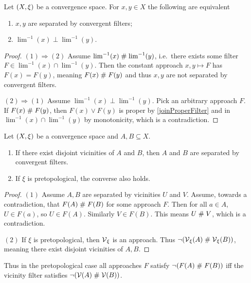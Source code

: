 \begin{lemma} \label{pointsSeparatedConvergentFilters}
Let $\left( X,\xi \right)$ be a convergence space. For $x,y\in X$ the following are equivalent
\begin{enumerate}
\item $x,y$ are separated by convergent filters;
\item $\lim^{-1}(x)\perp \lim^{-1}(y)$.
\end{enumerate}
\end{lemma}
\begin{proof}
$(1) \Rightarrow (2)$ Assume $\lim^{-1}(x)\mathrel{\#} \lim^{-1}(y)$, i.e.\ there exists some filter $F\in \lim^{-1}(x)\cap \lim^{-1}(y)$. Then the constant approach $x,y\mapsto F$ has $F(x) = F(y)$, meaning $F(x)\mathrel{\#} F(y)$ and thus $x,y$ are not separated by convergent filters.

$(2) \Rightarrow (1)$ Assume $\lim^{-1}(x)\perp \lim^{-1}(y)$. Pick an arbitrary approach $F$. If $F(x)\mathrel{\#} F(y)$, then $F(x)\vee F(y)$ is proper by \ref{joinProperFilter} and in $\lim^{-1}(x)\cap \lim^{-1}(y)$ by monotonicity, which is a contradiction.
\end{proof}

\begin{proposition} \label{disjointVicinitiesConvergentFilterSeparation}
Let $\left( X,\xi \right)$ be a convergence space and $A,B\subseteq X$.
\begin{enumerate}
\item If there exist disjoint vicinities of $A$ and $B$, then $A$ and $B$ are separated by convergent filters.
\item If $\xi$ is pretopological, the converse also holds.
\end{enumerate}
\end{proposition}
\begin{proof}
$(1)$ Assume $A,B$ are separated by vicinities $U$ and $V$. Assume, towards a contradiction, that $F(A)\mathrel{\#} F(B)$ for some approach $F$. Then for all $a\in A$, $U\in F(a)$, so $U\in F(A)$. Similarly $V\in F(B)$. This means $U\mathrel{\#} V$, which is a contradiction.

$(2)$ If $\xi$ is pretopological, then $\operatorname{\mathcal{V}}_\xi$ is an approach. Thus $\neg(\operatorname{\mathcal{V}}_\xi(A)\mathrel{\#} \operatorname{\mathcal{V}}_\xi(B))$, meaning there exist disjoint vicinities of $A,B$.
\end{proof}
Thus in the pretopological case all approaches $F$ satisfy $\neg(F(A)\mathrel{\#} F(B))$ iff the vicinity filter satisfies $\neg(\operatorname{\mathcal{V}}(A)\mathrel{\#} \operatorname{\mathcal{V}}(B))$.

